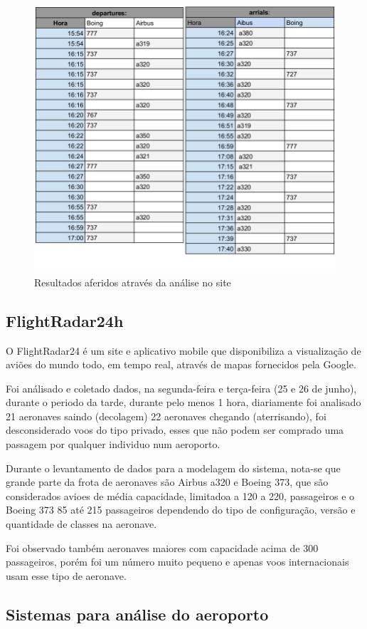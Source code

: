 \documentclass[12pt]{article}
\begin{document}
\begin{figure}[ht]
  \centering
  \includegraphics[width=.6\textwidth]{dados.png}
  \caption{Resultados aferidos através da análise no site}
  \label{fig:saida}
\end{figure}

\subsection{FlightRadar24h}

O  FlightRadar24 é um site e aplicativo mobile que disponibiliza a
visualização de aviões do mundo todo, em tempo real, através de mapas 
fornecidos pela Google.

Foi análisado e coletado dados, na segunda-feira e terça-feira (25 e 26 de junho), durante 
o periodo da tarde, durante pelo menos 1 hora, diariamente foi analisado 21
aeronaves saindo (decolagem) 22 aeronaves chegando (aterrisando), foi desconsiderado voos do 
tipo privado, esses que não podem ser comprado uma passagem por qualquer
individuo num aeroporto.

Durante o levantamento de dados para a modelagem do sistema, nota-se que grande parte
da frota de aeronaves são Airbus a320 e Boeing 373, que são considerados avioes de média
capacidade, limitadoa a 120 a 220, passageiros e o Boeing 373 85 até 215 passageiros 
dependendo do tipo de configuração, versão e quantidade de classes na aeronave.

Foi observado também aeronaves maiores com capacidade acima de 300 passageiros, porém 
foi um número muito pequeno e apenas voos internacionais usam esse tipo de aeronave.

\subsection{Sistemas para análise do aeroporto}
\end{document}

